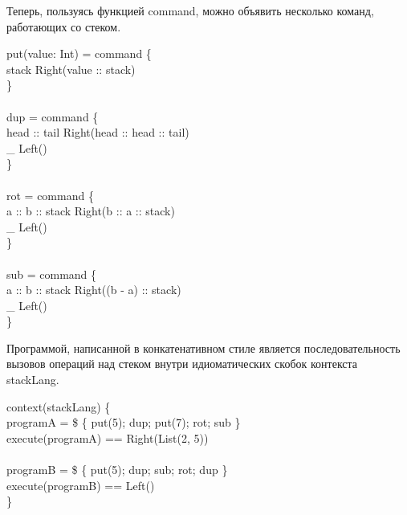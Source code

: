 Теперь, пользуясь функцией \<command\>, можно объявить несколько команд, работающих со стеком.

\begin{haskell}
 put(value: Int) = command \{ \\
\quad\quad {} stack \Rightarrow Right(value :: stack) \\
\} \\
{} \\
 dup = command \{ \\
\quad\quad {} head :: tail \Rightarrow Right(head :: head :: tail) \\
\quad\quad {} \_ \Rightarrow Left() \\
\} \\
{} \\
 rot = command \{ \\
\quad\quad {} a :: b :: stack \Rightarrow Right(b :: a :: stack) \\
\quad\quad {} \_ \Rightarrow Left() \\
\} \\
{} \\
 sub = command \{ \\
\quad\quad {} a :: b :: stack \Rightarrow Right((b - a) :: stack) \\
\quad\quad {} \_ \Rightarrow Left() \\
\}
\end{haskell}

Программой, написанной в конкатенативном стиле является последовательность вызовов операций над стеком внутри идиоматических скобок  контекста \<stackLang\>. 

\begin{haskell}
context(stackLang) \{ \\
\quad\quad {} programA = \$ \{ put(5); dup; put(7); rot; sub \} \\
\quad\quad execute(programA) == Right(List(2, 5)) \\
{} \\
\quad\quad {} programB = \$ \{ put(5); dup; sub; rot; dup \} \\
\quad\quad execute(programB) == Left() \\
\}
\end{haskell}

